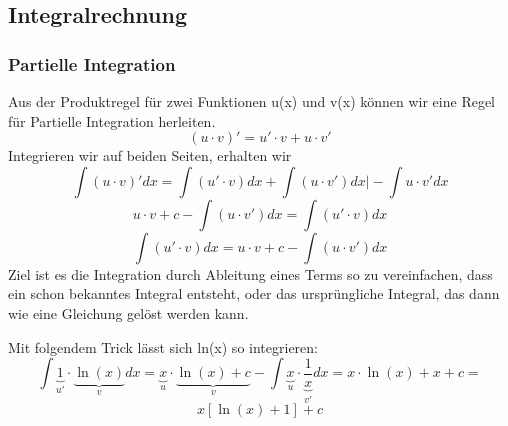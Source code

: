 \documentclass[
	11pt, %
]{beamer}
\begin{document}
\subsection{Integralrechnung}
\begin{frame}

	\frametitle{Partielle Integration}
	
	Aus der Produktregel f\"ur zwei Funktionen u(x) und v(x) k\"onnen wir eine Regel f\"ur Partielle Integration herleiten. 
	\begin{equation}
		(u\cdot v)' = u'\cdot v + u\cdot v'
	\end{equation}	
	Integrieren wir auf beiden Seiten, erhalten wir
	\begin{equation}
		\int(u\cdot v)'dx = \int (u'\cdot v)dx + \int (u\cdot v')dx\bigg|-\int u\cdot v'dx
	\end{equation}
	\begin{equation}
		u\cdot v + c - \int (u\cdot v')dx = \int (u'\cdot v)dx
	\end{equation}
	\begin{equation}
		 \int (u'\cdot v)dx = u\cdot v + c - \int (u\cdot v')dx
	\end{equation}
	Ziel ist es die Integration durch Ableitung eines Terms so zu vereinfachen, dass ein schon bekanntes Integral entsteht, oder das urspr\"ungliche Integral, das dann wie eine Gleichung gel\"ost werden kann.
\end{frame}
\begin{frame}
	\begin{exampleblock}{Mit folgendem Trick l\"asst sich ln(x) so integrieren:}
		\begin{equation}
			\int \underbrace{1}_{u'}\cdot \underbrace{\ln(x)}_{v}dx = \underbrace{x}_{u}\cdot \underbrace{\ln(x) + c}_{v} -\int \underbrace{x}_{u}\cdot\frac{1}{\underbrace{x}_{v'}}dx = x\cdot \ln(x) + x + c =
		\end{equation}
		\begin{equation}
			x[\ln(x) + 1] + c
		\end{equation}
	\end{exampleblock}
\end{frame}
\end{document}
